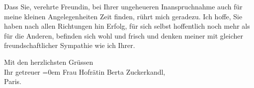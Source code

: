 \pstart
           Dass Sie, verehrte Freundin, bei
      Ihrer ungeheueren Inanspruchnahme auch für
      meine kleinen Angelegenheiten Zeit finden,
      rührt mich geradezu. Ich hoffe, Sie haben nach
      allen Richtungen hin Erfolg, für sich selbst
      hoffentlich noch mehr als für die Anderen,
      befinden sich wohl und frisch und denken meiner mit gleicher freundschaftlicher Sympathie
      wie ich Ihrer.\pend
           
\pstart
           {\pb}Mit den herzlichsten Grüssen{\\[\baselineskip]} Ihr getreuer\pend
           \leftskip=0em{}{\vspace{1\baselineskip}}
\pstart
           \noindent{}Frau Hofrätin Berta Zuckerkandl,{\\}Paris.\pend
           \endnumbering{}
\begin{anhang}
\end{anhang}\newcommand{\dateiname}{L03964}\newcommand{\titel}{Arthur Schnitzler an Berta Zuckerkandl, 11. 1. 1926}\newcommand{\editorInnen}{Herausgegeben von Jahnke, SelmaMüller, Martin Anton}
